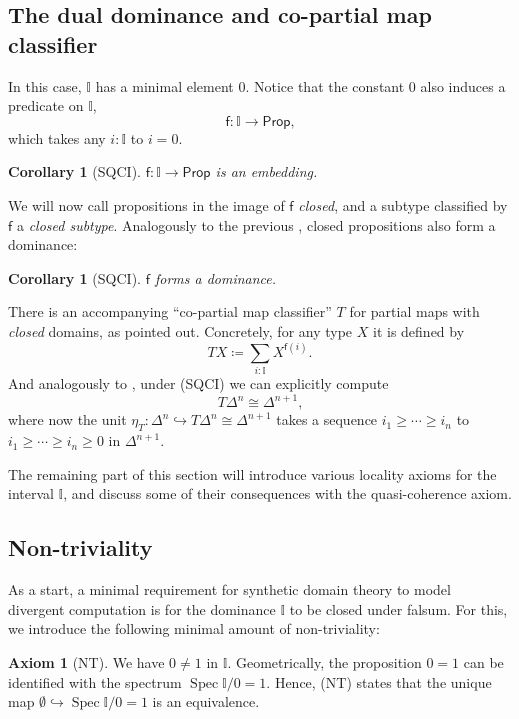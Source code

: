 \documentclass[a4paper,12pt]{amsart}
\newtheorem{corollary}[theorem]{Corollary}
\theoremstyle{definition}
\newtheorem*{axiom}{Axiom}
\newcommand{\mbb}[1]{\mathbb{#1}}
\newcommand{\I}{\mbb I}
\newcommand{\ms}[1]{\mathsf{#1}}
\newcommand{\hook}{\hookrightarrow}
\newcommand{\emp}{\emptyset}
\newcommand{\pp}{\ms{Prop}}
\newcommand{\spec}{\operatorname{Spec}}
\newcommand\isfsym{\ms{f}}
\newcommand\isf[1]{\isfsym(#1)}
\begin{document}
\subsection{The dual dominance and co-partial map classifier}
In this case, $\I$ has a minimal element $0$. Notice that the constant $0$ also induces a predicate on $\I$,
\[ \isfsym\colon \I \to \pp\text{,} \]
which takes any $i : \I$ to $i = 0$. 

\begin{corollary}[SQCI]
  $\isfsym\colon \I \to \pp$ is an embedding.
\end{corollary}

We will now call propositions in the image of $\isfsym$ \emph{closed}, and a subtype classified by $\isfsym$ a \emph{closed subtype}. Analogously to the previous , closed propositions also form a dominance:

\begin{corollary}[SQCI]\label{cor:dualisdominance}
  $\isfsym$ forms a dominance.
\end{corollary}

There is an accompanying ``co-partial map classifier'' $T$ for partial maps with \emph{closed} domains, as \citet{hyland1990first} pointed out. Concretely, for any type $X$ it is defined by
\[ T X \coloneq \sum_{i:\I} X^{\isf{i}}\text{.} \]
And analogously to , under (SQCI) we can explicitly compute 
\[ T\Delta^n \cong \Delta^{n+1}\text{,} \]
where now the unit $\eta_T \colon \Delta^n \hook T\Delta^n \cong \Delta^{n+1}$ takes a sequence $i_1 \ge \cdots \ge i_n$ to $i_1 \ge \cdots \ge i_n \ge 0$ in $\Delta^{n+1}$. 

The remaining part of this section will introduce various locality axioms for the interval $\I$, and discuss some of their consequences with the quasi-coherence axiom.

\subsection{Non-triviality}

As a start, a minimal requirement for synthetic domain theory to model divergent computation is for the dominance $\I$ to be closed under falsum. For this, we introduce the following minimal amount of non-triviality:

\begin{axiom}[NT]\label{ax:nt}
  We have $0 \neq 1$ in $\I$. Geometrically, the proposition $0 = 1$ can be identified with the spectrum $\spec\I/0=1$. Hence, (NT) states that the unique map $\emp \hook \spec\I/0=1$ is an equivalence.
\end{axiom}
\end{document}
